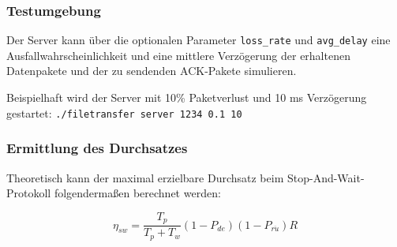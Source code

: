 \documentclass{article}
\begin{document}
		\newpage

			\subsubsection{Testumgebung}
			Der Server kann über die optionalen Parameter \texttt{loss\_rate} und \texttt{avg\_delay} eine Ausfallwahrscheinlichkeit und eine mittlere Verzögerung der erhaltenen Datenpakete und der zu sendenden ACK-Pakete simulieren.

			Beispielhaft wird der Server mit 10\% Paketverlust und 10 ms Verzögerung gestartet: \texttt{./filetransfer server 1234 0.1 10}
			

			\subsubsection{Ermittlung des Durchsatzes}
			Theoretisch kann der maximal erzielbare Durchsatz beim Stop-And-Wait-Protokoll folgendermaßen berechnet werden:

			\begin{equation*}
				\eta_{sw} = \frac{T_p}{T_p + T_w}(1-P_{de})(1-P_{r\ddot{u}})R
			\end{equation*}
\end{document}
